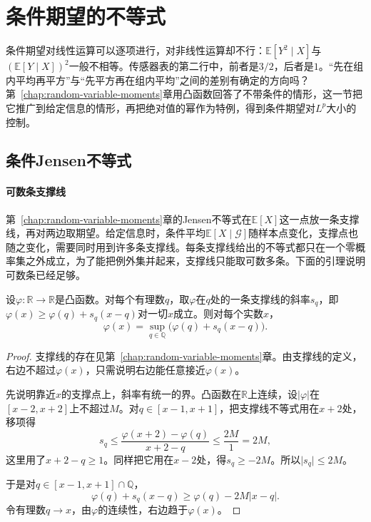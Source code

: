 \section{条件期望的不等式}
\label{sec:cexp-inequalities}

条件期望对线性运算可以逐项进行，对非线性运算却不行：$\mathbb{E}[Y^{2}\mid X]$与$(\mathbb{E}[Y\mid X])^{2}$一般不相等。传感器表的第二行中，前者是$3/2$，后者是$1$。“先在组内平均再平方”与“先平方再在组内平均”之间的差别有确定的方向吗？第~\ref{chap:random-variable-moments}章用凸函数回答了不带条件的情形，这一节把它推广到给定信息的情形，再把绝对值的幂作为特例，得到条件期望对$L^{p}$大小的控制。

\subsection{条件Jensen不等式}
\label{sec:cexp-jensen}

\paragraph{可数条支撑线}
第~\ref{chap:random-variable-moments}章的Jensen不等式在$\mathbb{E}[X]$这一点放一条支撑线，再对两边取期望。给定信息时，条件平均$\mathbb{E}[X\mid\mathcal{G}]$随样本点变化，支撑点也随之变化，需要同时用到许多条支撑线。每条支撑线给出的不等式都只在一个零概率集之外成立，为了能把例外集并起来，支撑线只能取可数多条。下面的引理说明可数条已经足够。

\begin{lemma}[凸函数是可数条直线的上包络]
\label{lem:cexp-countable-lines}
设$\varphi:\mathbb{R}\to\mathbb{R}$是凸函数。对每个有理数$q$，取$\varphi$在$q$处的一条支撑线的斜率$s_q$，即$\varphi(x)\geq\varphi(q)+s_q(x-q)$对一切$x$成立。则对每个实数$x$，
\begin{equation}
 \varphi(x)=\sup_{q\in\mathbb{Q}}\bigl(\varphi(q)+s_q(x-q)\bigr).
 \label{eq:cexp-countable-lines}
\end{equation}
\end{lemma}

\begin{proof}
支撑线的存在见第~\ref{chap:random-variable-moments}章。由支撑线的定义，右边不超过$\varphi(x)$，只需说明右边能任意接近$\varphi(x)$。

先说明靠近$x$的支撑点上，斜率有统一的界。凸函数在$\mathbb{R}$上连续，设$\lvert\varphi\rvert$在$[x-2,x+2]$上不超过$M$。对$q\in[x-1,x+1]$，把支撑线不等式用在$x+2$处，移项得
\[
 s_q\leq\frac{\varphi(x+2)-\varphi(q)}{x+2-q}\leq\frac{2M}{1}=2M ,
\]
这里用了$x+2-q\geq1$。同样把它用在$x-2$处，得$s_q\geq-2M$。所以$\lvert s_q\rvert\leq2M$。

于是对$q\in[x-1,x+1]\cap\mathbb{Q}$，
\[
 \varphi(q)+s_q(x-q)\geq\varphi(q)-2M\lvert x-q\rvert .
\]
令有理数$q\to x$，由$\varphi$的连续性，右边趋于$\varphi(x)$。
\end{proof}

